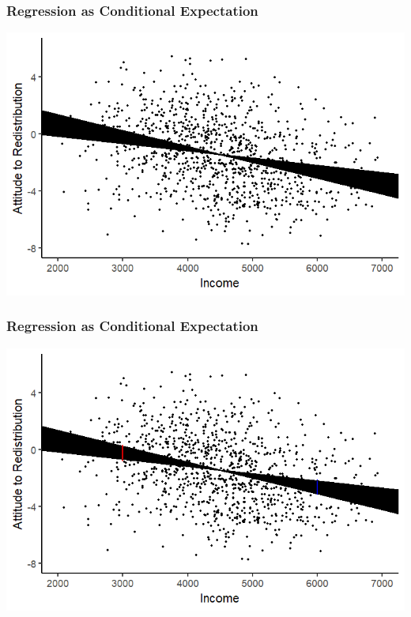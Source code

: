 \documentclass[xcolor=x11names,compress]{beamer}\usepackage[]{graphicx}\usepackage[]{color}
\makeatletter
\def\maxwidth{ %
  \ifdim\Gin@nat@width>\linewidth
    \linewidth
  \else
    \Gin@nat@width
  \fi
}
\newenvironment{knitrout}{}{} %
\renewcommand{\(}{\begin{columns}}
\renewcommand{\)}{\end{columns}}
\newcommand{\<}[1]{\begin{column}{#1}}
\renewcommand{\>}{\end{column}}
\makeatother
\begin{document}
\begin{frame}
\frametitle{Regression as Conditional Expectation}
\begin{knitrout}
\color{fgcolor}
\includegraphics[width=\maxwidth]{figure/cond_exp1g2-1} 

\end{knitrout}
\end{frame}

\begin{frame}
\frametitle{Regression as Conditional Expectation}
\begin{knitrout}
\color{fgcolor}
\includegraphics[width=\maxwidth]{figure/cond_exp1h-1} 

\end{knitrout}
\end{frame}
\end{document}

